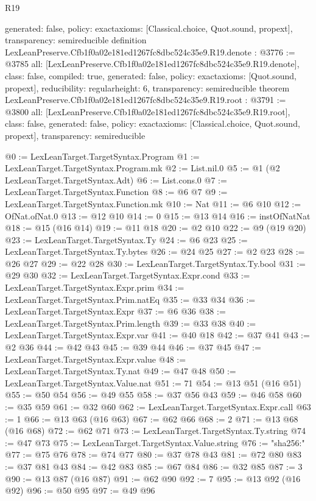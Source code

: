 \begin{lexlean}{R19}
\begin{coremodule}
{  generated: false,
  policy: exact{axioms: [Classical.choice, Quot.sound, propext]},
  transparency: semireducible
}
definition LexLeanPreserve.Cfb1f0a02e181ed1267fc8dbc524c35e9.R19.denote : @3776 := @3785 {
  all: [LexLeanPreserve.Cfb1f0a02e181ed1267fc8dbc524c35e9.R19.denote],
  class: false,
  compiled: true,
  generated: false,
  policy: exact{axioms: [Quot.sound, propext]},
  reducibility: regular{height: 6},
  transparency: semireducible
}
theorem LexLeanPreserve.Cfb1f0a02e181ed1267fc8dbc524c35e9.R19.root : @3791 := @3800 {
  all: [LexLeanPreserve.Cfb1f0a02e181ed1267fc8dbc524c35e9.R19.root],
  class: false,
  generated: false,
  policy: exact{axioms: [Classical.choice, Quot.sound, propext]},
  transparency: semireducible
}

@0 := LexLeanTarget.TargetSyntax.Program
@1 := LexLeanTarget.TargetSyntax.Program.mk
@2 := List.nil.{0}
@5 := @1 (@2 LexLeanTarget.TargetSyntax.Adt)
@6 := List.cons.{0}
@7 := LexLeanTarget.TargetSyntax.Function
@8 := @6 @7
@9 := LexLeanTarget.TargetSyntax.Function.mk
@10 := Nat
@11 := @6 @10
@12 := OfNat.ofNat.{0}
@13 := @12 @10
@14 := 0
@15 := @13 @14
@16 := instOfNatNat
@18 := @15 (@16 @14)
@19 := @11 @18
@20 := @2 @10
@22 := @9 (@19 @20)
@23 := LexLeanTarget.TargetSyntax.Ty
@24 := @6 @23
@25 := LexLeanTarget.TargetSyntax.Ty.bytes
@26 := @24 @25
@27 := @2 @23
@28 := @26 @27
@29 := @22 @28
@30 := LexLeanTarget.TargetSyntax.Ty.bool
@31 := @29 @30
@32 := LexLeanTarget.TargetSyntax.Expr.cond
@33 := LexLeanTarget.TargetSyntax.Expr.prim
@34 := LexLeanTarget.TargetSyntax.Prim.natEq
@35 := @33 @34
@36 := LexLeanTarget.TargetSyntax.Expr
@37 := @6 @36
@38 := LexLeanTarget.TargetSyntax.Prim.length
@39 := @33 @38
@40 := LexLeanTarget.TargetSyntax.Expr.var
@41 := @40 @18
@42 := @37 @41
@43 := @2 @36
@44 := @42 @43
@45 := @39 @44
@46 := @37 @45
@47 := LexLeanTarget.TargetSyntax.Expr.value
@48 := LexLeanTarget.TargetSyntax.Ty.nat
@49 := @47 @48
@50 := LexLeanTarget.TargetSyntax.Value.nat
@51 := 71
@54 := @13 @51 (@16 @51)
@55 := @50 @54
@56 := @49 @55
@58 := @37 @56 @43
@59 := @46 @58
@60 := @35 @59
@61 := @32 @60
@62 := LexLeanTarget.TargetSyntax.Expr.call
@63 := 1
@66 := @13 @63 (@16 @63)
@67 := @62 @66
@68 := 2
@71 := @13 @68 (@16 @68)
@72 := @62 @71
@73 := LexLeanTarget.TargetSyntax.Ty.string
@74 := @47 @73
@75 := LexLeanTarget.TargetSyntax.Value.string
@76 := "sha256:"
@77 := @75 @76
@78 := @74 @77
@80 := @37 @78 @43
@81 := @72 @80
@83 := @37 @81 @43
@84 := @42 @83
@85 := @67 @84
@86 := @32 @85
@87 := 3
@90 := @13 @87 (@16 @87)
@91 := @62 @90
@92 := 7
@95 := @13 @92 (@16 @92)
@96 := @50 @95
@97 := @49 @96

\end{coremodule}
\end{lexlean}
